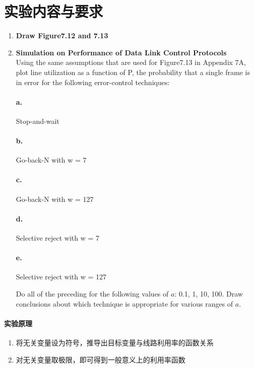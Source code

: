\documentclass[a4paper]{ctexart}
\begin{document}
  \section{实验内容与要求}
    \begin{enumerate}
      \item \textbf{Draw Figure7.12 and 7.13}
      \item \textbf{Simulation on Performance of Data Link Control Protocols}\\
      Using the same assumptions that are used for Figure7.13 in Appendix 7A,
      plot line utilization as a function of P, the probability that a single frame is in error
      for the following error-control techniques:
      \paragraph*{a.} Stop-and-wait
      \paragraph*{b.} Go-back-N with w = 7
      \paragraph*{c.} Go-back-N with w = 127
      \paragraph*{d.} Selective reject with w = 7
      \paragraph*{e.} Selective reject with w = 127

      Do all of the preceding for the following values of $a$: 0.1, 1, 10, 100.
      Draw conclusions about which technique is appropriate for various ranges of $a$.
    \end{enumerate}

    \paragraph*{实验原理}
    \begin{enumerate}
      \item 将无关变量设为符号，推导出目标变量与线路利用率的函数关系
      \item 对无关变量取极限，即可得到一般意义上的利用率函数
    \end{enumerate}
\end{document}
